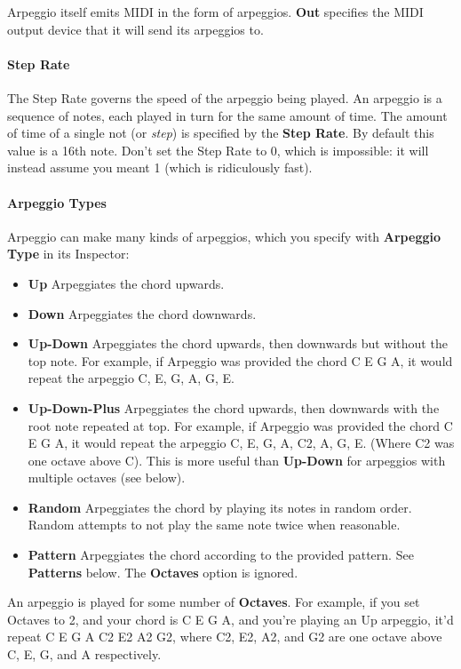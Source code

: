 \documentclass[twoside,10pt]{article}
\begin{document}
Arpeggio itself emits MIDI in the form of arpeggios. {\bf Out} specifies the MIDI output device that it will send its arpeggios to.

\paragraph{Step Rate}

The Step Rate governs the speed of the arpeggio being played.  An arpeggio is a sequence of notes, each played in turn for the same amount of time.  The amount of time of a single not (or {\it step}) is specified by the {\bf Step Rate}.  By default this value is a 16th note.  Don't set the Step Rate to 0, which is impossible: it will instead assume you meant 1 (which is ridiculously fast).


\paragraph{Arpeggio Types}

Arpeggio can make many kinds of arpeggios, which you specify with {\bf Arpeggio Type} in its Inspector:

\begin{itemize}
\item {\bf Up} Arpeggiates the chord upwards. 
\item {\bf Down} Arpeggiates the chord downwards. 
\item {\bf Up-Down} Arpeggiates the chord upwards, then downwards but without the top note.  For example, if Arpeggio was provided the chord C E G A, it would repeat the arpeggio C, E, G, A, G, E.
\item {\bf Up-Down-Plus} Arpeggiates the chord upwards, then downwards with the root note repeated at top.  For example, if Arpeggio was provided the chord C E G A, it would repeat the arpeggio C, E, G, A, C2, A, G, E.  (Where C2 was one octave above C).  This is more useful than {\bf Up-Down} for arpeggios with multiple octaves (see below).  
\item {\bf Random} Arpeggiates the chord by playing its notes in random order.  Random attempts to not play the same note twice when reasonable. 
\item {\bf Pattern} Arpeggiates the chord according to the provided pattern.  See {\bf Patterns} below.   The {\bf Octaves} option is ignored.
\end{itemize}

An arpeggio is played for some number of {\bf Octaves}.  For example, if you set Octaves to 2, and your chord is C E G A, and you're playing an Up arpeggio, it'd repeat C E G A C2 E2 A2 G2, where C2, E2, A2, and G2 are one octave above C, E, G, and A respectively.
\end{document}
